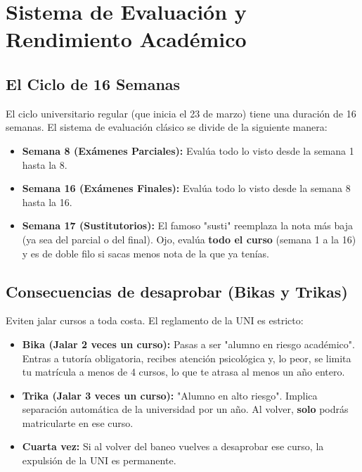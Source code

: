 \section{Sistema de Evaluación y Rendimiento Académico}

\subsection{El Ciclo de 16 Semanas}
El ciclo universitario regular (que inicia el 23 de marzo) tiene una duración de 16 semanas. El sistema de evaluación clásico se divide de la siguiente manera:
\begin{itemize}
    \item \textbf{Semana 8 (Exámenes Parciales):} Evalúa todo lo visto desde la semana 1 hasta la 8.
    \item \textbf{Semana 16 (Exámenes Finales):} Evalúa todo lo visto desde la semana 8 hasta la 16.
    \item \textbf{Semana 17 (Sustitutorios):} El famoso "susti" reemplaza la nota más baja (ya sea del parcial o del final). Ojo, evalúa \textbf{todo el curso} (semana 1 a la 16) y es de doble filo si sacas menos nota de la que ya tenías.
\end{itemize}

\subsection{Consecuencias de desaprobar (Bikas y Trikas)}
Eviten jalar cursos a toda costa. El reglamento de la UNI es estricto:
\begin{itemize}
    \item \textbf{Bika (Jalar 2 veces un curso):} Pasas a ser "alumno en riesgo académico". Entras a tutoría obligatoria, recibes atención psicológica y, lo peor, se limita tu matrícula a menos de 4 cursos, lo que te atrasa al menos un año entero.
    \item \textbf{Trika (Jalar 3 veces un curso):} "Alumno en alto riesgo". Implica separación automática de la universidad por un año. Al volver, \textbf{solo} podrás matricularte en ese curso.
    \item \textbf{Cuarta vez:} Si al volver del baneo vuelves a desaprobar ese curso, la expulsión de la UNI es permanente.
\end{itemize}
